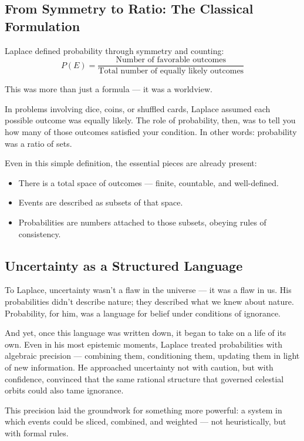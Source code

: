 \subsection{From Symmetry to Ratio: The Classical Formulation}

Laplace defined probability through symmetry and counting:
\[
P(E) = \frac{\text{Number of favorable outcomes}}{\text{Total number of equally likely outcomes}}
\]

This was more than just a formula — it was a worldview.

In problems involving dice, coins, or shuffled cards, Laplace assumed each possible outcome was equally likely. The role of probability, then, was to tell you how many of those outcomes satisfied your condition. In other words: probability was a ratio of sets.

Even in this simple definition, the essential pieces are already present:
\begin{itemize}
    \item There is a total space of outcomes — finite, countable, and well-defined.
    \item Events are described as subsets of that space.
    \item Probabilities are numbers attached to those subsets, obeying rules of consistency.
\end{itemize}

\subsection{Uncertainty as a Structured Language}

To Laplace, uncertainty wasn’t a flaw in the universe — it was a flaw in us. His probabilities didn’t describe nature; they described what we knew about nature. Probability, for him, was a language for belief under conditions of ignorance.

And yet, once this language was written down, it began to take on a life of its own. Even in his most epistemic moments, Laplace treated probabilities with algebraic precision — combining them, conditioning them, updating them in light of new information. He approached uncertainty not with caution, but with confidence, convinced that the same rational structure that governed celestial orbits could also tame ignorance.

This precision laid the groundwork for something more powerful: a system in which events could be sliced, combined, and weighted — not heuristically, but with formal rules.


